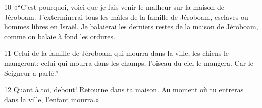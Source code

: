 
10 «“C’est pourquoi, voici que je fais venir le malheur sur la maison de Jéroboam. J’exterminerai tous les mâles de la famille de Jéroboam, esclaves ou hommes libres en Israël. Je balaierai les derniers restes de la maison de Jéroboam, comme on balaie à fond les ordures.

11 Celui de la famille de Jéroboam qui mourra dans la ville, les chiens le mangeront; celui qui mourra dans les champs, l’oiseau du ciel le mangera. Car le Seigneur a parlé.”

12 Quant à toi, debout! Retourne dans ta maison. Au moment où tu entreras dans la ville, l’enfant mourra.»